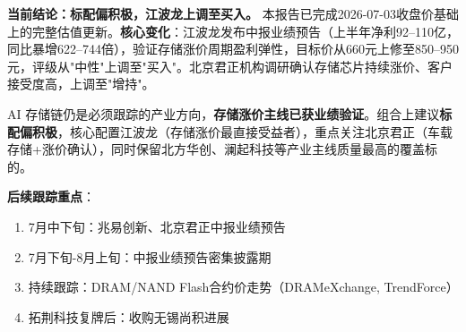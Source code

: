 \textbf{当前结论：标配偏积极，江波龙上调至买入。} 本报告已完成2026-07-03收盘价基础上的完整估值更新。\textbf{核心变化}：江波龙发布中报业绩预告（上半年净利92--110亿，同比暴增622--744倍），验证存储涨价周期盈利弹性，目标价从660元上修至850--950元，评级从"中性"上调至"买入"。北京君正机构调研确认存储芯片持续涨价、客户接受度高，上调至"增持"。

AI 存储链仍是必须跟踪的产业方向，\textbf{存储涨价主线已获业绩验证}。组合上建议\textbf{标配偏积极}，核心配置江波龙（存储涨价最直接受益者），重点关注北京君正（车载存储+涨价确认），同时保留北方华创、澜起科技等产业主线质量最高的覆盖标的。\par

\vspace{0.5em}
\noindent\textbf{后续跟踪重点}：
\begin{enumerate}[label=\protect\gmark]
  \item 7月中下旬：兆易创新、北京君正中报业绩预告
  \item 7月下旬-8月上旬：中报业绩预告密集披露期
  \item 持续跟踪：DRAM/NAND Flash合约价走势（DRAMeXchange, TrendForce）
  \item 拓荆科技复牌后：收购无锡尚积进展
\end{enumerate}
